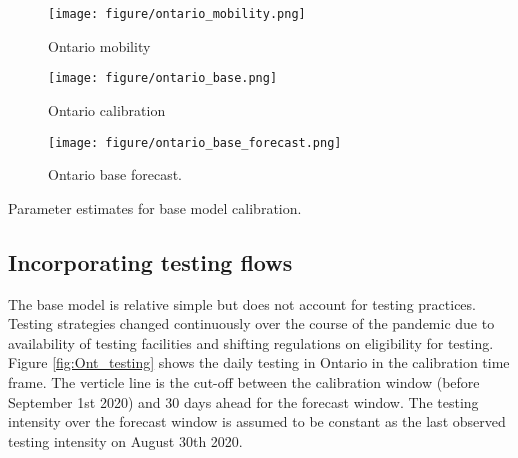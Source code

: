 \documentclass[12pt]{article}\usepackage[]{graphicx}\usepackage[]{color}
\begin{document}
\begin{figure}[ht!]
\texttt{[image: figure/ontario\_mobility.png]}

\caption{Ontario mobility }
\label{fig:Ont_mobility}
\end{figure}





\begin{figure}[ht!]
\texttt{[image: figure/ontario\_base.png]}

\caption{Ontario calibration }
\label{fig:Ont_calibration}
\end{figure}

\begin{figure}[ht!]
\texttt{[image: figure/ontario\_base\_forecast.png]}

\caption{Ontario base forecast. }
\label{fig:Ont_calibration_base_forecast}
\end{figure}

\begin{table}
\centering

\caption{Parameter estimates for base model calibration. }
\label{table:base}
\end{table}


\FloatBarrier

\subsection{Incorporating testing flows}

The base model is relative simple but does not account for testing practices. Testing strategies changed continuously over the course of the pandemic due to availability of testing facilities and shifting regulations on eligibility for testing. Figure \ref{fig:Ont_testing} shows the daily testing in Ontario in the calibration time frame. The verticle line is the cut-off between the calibration window (before September 1st 2020) and 30 days ahead for the forecast window. The testing intensity over the forecast window is assumed to be constant as the last observed testing intensity on August 30th 2020.  
\end{document}
